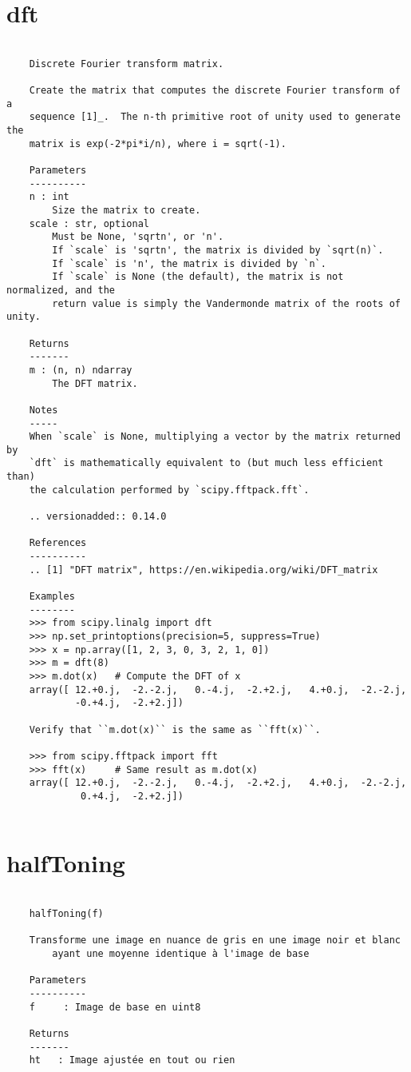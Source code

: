 \section{dft}
\begin{lstlisting}[style=docstringstyle]

    Discrete Fourier transform matrix.

    Create the matrix that computes the discrete Fourier transform of a
    sequence [1]_.  The n-th primitive root of unity used to generate the
    matrix is exp(-2*pi*i/n), where i = sqrt(-1).

    Parameters
    ----------
    n : int
        Size the matrix to create.
    scale : str, optional
        Must be None, 'sqrtn', or 'n'.
        If `scale` is 'sqrtn', the matrix is divided by `sqrt(n)`.
        If `scale` is 'n', the matrix is divided by `n`.
        If `scale` is None (the default), the matrix is not normalized, and the
        return value is simply the Vandermonde matrix of the roots of unity.

    Returns
    -------
    m : (n, n) ndarray
        The DFT matrix.

    Notes
    -----
    When `scale` is None, multiplying a vector by the matrix returned by
    `dft` is mathematically equivalent to (but much less efficient than)
    the calculation performed by `scipy.fftpack.fft`.

    .. versionadded:: 0.14.0

    References
    ----------
    .. [1] "DFT matrix", https://en.wikipedia.org/wiki/DFT_matrix

    Examples
    --------
    >>> from scipy.linalg import dft
    >>> np.set_printoptions(precision=5, suppress=True)
    >>> x = np.array([1, 2, 3, 0, 3, 2, 1, 0])
    >>> m = dft(8)
    >>> m.dot(x)   # Compute the DFT of x
    array([ 12.+0.j,  -2.-2.j,   0.-4.j,  -2.+2.j,   4.+0.j,  -2.-2.j,
            -0.+4.j,  -2.+2.j])

    Verify that ``m.dot(x)`` is the same as ``fft(x)``.

    >>> from scipy.fftpack import fft
    >>> fft(x)     # Same result as m.dot(x)
    array([ 12.+0.j,  -2.-2.j,   0.-4.j,  -2.+2.j,   4.+0.j,  -2.-2.j,
             0.+4.j,  -2.+2.j])
    
\end{lstlisting}
\section{halfToning}
\begin{lstlisting}[style=docstringstyle]

    halfToning(f)
    
    Transforme une image en nuance de gris en une image noir et blanc 
        ayant une moyenne identique à l'image de base
    
    Parameters
    ----------
    f     : Image de base en uint8

    Returns
    -------
    ht   : Image ajustée en tout ou rien
    
\end{lstlisting}

